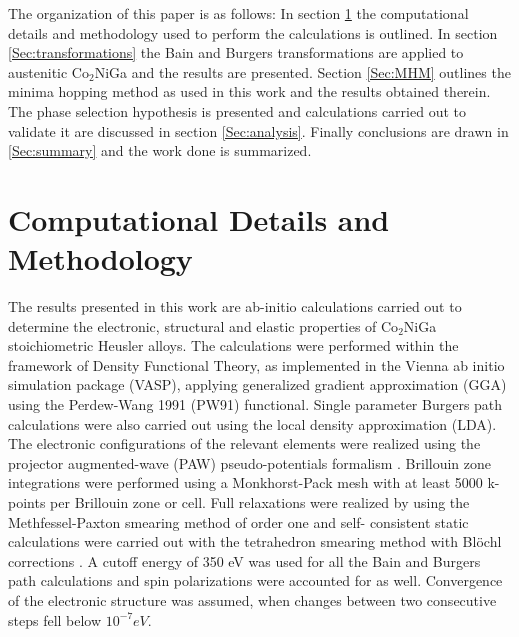 \documentclass[%
preprint,
 amsmath,amssymb,
 aps,
prb,
showkeys,
]{revtex4-1}
\begin{document}
The organization of this paper is as follows: In section \ref{Sec:computational_details}  the computational details and methodology used to perform the calculations is outlined.  In section \ref{Sec:transformations} the Bain and Burgers transformations are applied to austenitic Co$_2$NiGa and the results are presented.  Section \ref{Sec:MHM} outlines the minima hopping method as used in this work and the results obtained  therein. The phase selection hypothesis is presented and calculations carried out to validate it are discussed in section \ref{Sec:analysis}. Finally conclusions are drawn in  \ref{Sec:summary} and the work done is summarized. 
\section{Computational Details and Methodology}
\label{Sec:computational_details}
	The results presented in this work are ab-initio calculations carried out to determine the electronic, structural and elastic properties of Co$_2$NiGa stoichiometric Heusler alloys. The calculations were performed within the framework of Density Functional Theory, as implemented in the Vienna ab initio simulation package (VASP)\cite{Kresse1996}, applying generalized gradient approximation (GGA) using the Perdew-Wang 1991 (PW91) functional\cite{Perdew1992}. Single parameter Burgers path calculations were also carried out using the local density approximation (LDA)\cite{LDA}. The electronic configurations of the relevant elements were realized using  the projector augmented-wave (PAW) pseudo-potentials formalism \cite{blochl1994paw}. Brillouin zone integrations were performed using a Monkhorst-Pack mesh \cite{monkhorst1976} with at least 5000 k-points per Brillouin zone or cell. Full relaxations were realized by using the Methfessel-Paxton smearing method of order one \cite{methfessel1989} and self-
consistent static calculations were carried out  with the tetrahedron smearing method with Bl\"{o}chl  corrections \cite{blochl1994improved}. A cutoff energy of 350 eV was used for all the  Bain and Burgers path calculations and spin polarizations were accounted for as well. Convergence of the electronic structure was assumed, when changes between two consecutive steps fell below $10^{-7} eV$.
\end{document}
